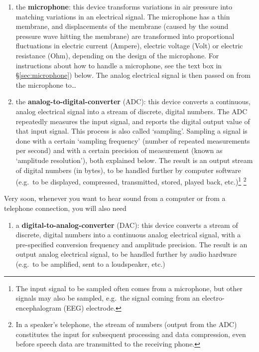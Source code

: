 \documentclass[
]{book}
\providecommand{\tightlist}{%
  \setlength{\itemsep}{0pt}\setlength{\parskip}{0pt}}
\begin{document}
\begin{enumerate}
\def\labelenumi{(\arabic{enumi})}
\item
  the \textbf{microphone}: this device transforms variations in air pressure into matching variations in an electrical signal. The microphone has a thin membrane, and displacements of the membrane (caused by the sound pressure wave hitting the membrane) are transformed into proportional fluctuations in electric current (Ampere), electric voltage (Volt) or electric resistance (Ohm), depending on the design of the microphone. For instructions about how to handle a microphone, see the text box in §\ref{sec:microphone}) below.
  The analog electrical signal is then passed on from the microphone to\ldots{}
\item
  the \textbf{analog-to-digital-converter} (ADC): this device converts a continuous, analog electrical signal into a stream of discrete, digital numbers. The ADC repeatedly measures the input signal, and reports the digital output value of that input signal. This process is also called `sampling'. Sampling a signal is done with a certain `sampling frequency' (number of repeated measurements per second) and with a certain precision of measurement (known as `amplitude resolution'), both explained below. The result is an output stream of digital numbers (in bytes), to be handled further by computer software (e.g.~to be displayed, compressed, transmitted, stored, played back, etc.)\footnote{The input signal to be sampled often comes from a microphone, but other signals may also be sampled, e.g.~the signal coming from an electro-encephalogram (EEG) electrode.} \footnote{In a speaker's telephone, the stream of numbers (output from the ADC) constitutes the input for subsequent processing and data compression, even before speech data are transmitted to the receiving phone.}
\end{enumerate}

Very soon, whenever you want to hear sound from a computer or from a telephone connection, you will also need

\begin{enumerate}
\def\labelenumi{(\arabic{enumi})}
\setcounter{enumi}{2}
\tightlist
\item
  a \textbf{digital-to-analog-converter} (DAC): this device converts a stream of discrete, digital numbers into a continuous analog electrical signal, with a pre-specified conversion frequency and amplitude precision. The result is an output analog electrical signal, to be handled further by audio hardware (e.g.~to be amplified, sent to a loudspeaker, etc.)
\end{enumerate}
\end{document}
